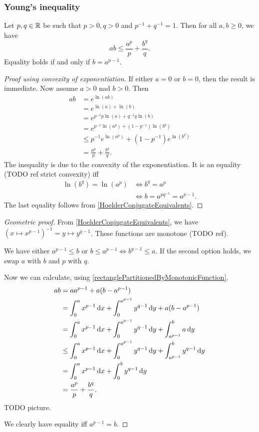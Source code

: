 \subsubsection{Young's inequality}
\begin{theorem} \label{YoungsInequality}
Let $p,q\in \mathbb{R}$ be such that $p>0, q>0$ and $p^{-1} + q^{-1} = 1$. Then for all $a,b \geq 0$, we have
\[ ab \leq \frac{a^p}{p} + \frac{b^q}{q}. \]
Equality holds \textup{if and only if} $b = a^{p-1}$.
\end{theorem}
\begin{proof}[Proof using convexity of exponentiation]
If either $a=0$ or $b =0$, then the result is immediate. Now assume $a>0$ nad $b>0$. Then
\begin{align*}
ab &= e^{\ln(ab)} \\
&= e^{\ln(a)+\ln(b)} \\
&= e^{p^{-1}p\ln(a)+q^{-1}q\ln(b)} \\
&= e^{p^{-1}\ln(a^p)+(1-p^{-1})\ln(b^q)} \\
&\leq p^{-1}e^{\ln(a^p)}+(1-p^{-1})e^{\ln(b^q)} \\
&= \frac{a^p}{p} + \frac{b^q}{q}.
\end{align*}
The inequality is due to the convexity of the exponentiation. It is an equality (TODO ref strict convexity) iff
\begin{align*}
\ln(b^q) = \ln(a^p) &\iff b^q = a^p \\
&\iff b = a^{pq^{-1}} = a^{p-1}.
\end{align*}
The last equality follows from \ref{HoelderConjugateEquivalents}.
\end{proof}
\begin{proof}[Geometric proof]
From \ref{HoelderConjugateEquivalents}, we have $(x\mapsto x^{p-1})^{-1} = y\mapsto y^{q-1}$. These functions are monotone (TODO ref).

We have either $a^{p-1}\leq b$ or $b\leq a^{p-1} \iff b^{q-1} \leq a$. If the second option holds, we swap $a$ with $b$ and $p$ with $q$.

Now we can calculate, using \ref{rectanglePartitionedByMonotonicFunction},
\begin{align*}
ab &= aa^{p-1} + a(b-a^{p-1}) \\
&= \int_0^a x^{p-1}\diff{x} + \int_0^{a^{p-1}} y^{q-1}\diff{y} + a(b-a^{p-1}) \\
&= \int_0^a x^{p-1}\diff{x} + \int_0^{a^{p-1}} y^{q-1}\diff{y} + \int_{a^{p-1}}^b a\diff{y} \\
&\leq \int_0^a x^{p-1}\diff{x} + \int_0^{a^{p-1}} y^{q-1}\diff{y} + \int_{a^{p-1}}^b y^{q-1}\diff{y} \\
&= \int_0^a x^{p-1}\diff{x} + \int_0^{b} y^{q-1}\diff{y} \\
&= \frac{a^p}{p} + \frac{b^q}{q}.
\end{align*}
TODO picture.

We clearly have equality iff $a^{p-1} = b$.
\end{proof}

